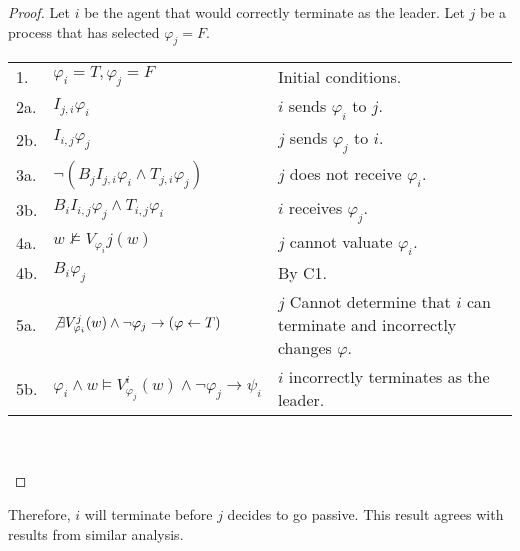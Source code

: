 \begin{proof}
Let $i$ be the agent that would correctly terminate as the leader. Let $j$ be a process that has selected $\varphi_j = F$.

\begin{table}[H]
\centering
\small
\begin{tabularx}{\linewidth}{l X X}
1. & $\varphi_i = T, \varphi_j = F$ & Initial conditions. \\
2a.& $I_{j,i} \varphi_i$ & $i$ sends $\varphi_i$ to $j$. \\
2b.& $I_{i,j} \varphi_j$ & $j$ sends $\varphi_j$ to $i$. \\
3a.& $\neg (B_j I_{j,i} \varphi_i \wedge T_{j,i} \varphi_j)$ & $j$ does not receive $\varphi_i$. \\
3b.& $B_i I_{i,j} \varphi_j \wedge T_{i,j} \varphi_i$ & $i$ receives $\varphi_j$. \\
4a.& $w \not \vDash V_{\varphi_i}{j}(w)$ & $j$ cannot valuate $\varphi_i$. \\
4b.& $B_i \varphi_j$ & By C1. \\
5a. & $\not \exists V_{\varphi_i}^j(w) \wedge \neg \varphi_j \rightarrow (\varphi \gets T)$ & $j$ Cannot determine that $i$ can terminate and incorrectly changes $\varphi$. \\
5b. & $\varphi_i \wedge w \vDash V_{\varphi_j}^i(w) \wedge \neg \varphi_j \rightarrow \psi_i$ & $i$ incorrectly terminates as the leader. \\

\end{tabularx} \\~\\
\label{tab:anonymityproof}
\end{table}
\end{proof}

Therefore, $i$ will terminate before $j$ decides to go passive.
This result agrees with results from similar analysis\cite{anon-omission}.



